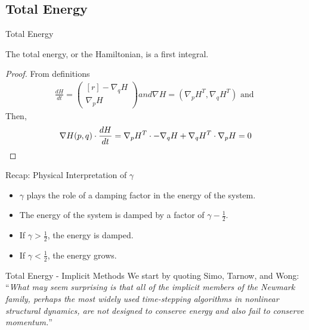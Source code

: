 \documentclass{beamer}
\begin{document}
\subsection{Total Energy}
\begin{frame}{Total Energy}
\begin{theorem} The total energy, or the Hamiltonian, is a first integral. \end{theorem}
\begin{proof}
From definitions
\begin{align*}
	\frac{dH}{dt} = \begin{pmatrix*}[r] -\nabla_{q}H \\ \nabla_{p}H \end{pmatrix*} and \nabla H = \left(\nabla_{p}H^{T}, \nabla_{q}H^{T}\right) \mbox{ and } 	
\end{align*}
Then, 
$$
\nabla H(p, q) \cdot \frac{dH}{dt} = \nabla_{p}H^{T}\cdot-\nabla_{q}H + \nabla_{q}H^{T}\cdot \nabla_{p}H = 0 \qedhere
$$
\end{proof} 
\end{frame}

\begin{frame}{Recap: Physical Interpretation of $\gamma$}
\begin{itemize}
	\item
	$\gamma$ plays the role of a damping factor in the energy of the system.
	\item
	The energy of the system is damped by a factor of $\gamma - \frac{1}{2}$.
	\item
	If $\gamma > \frac{1}{2}$, the energy is damped.
	\item
	If $\gamma < \frac{1}{2}$, the energy grows.
\end{itemize}
\end{frame}

\begin{frame}{Total Energy - Implicit Methods}
We start by quoting Simo, Tarnow, and Wong: \\
``\textit{What may seem surprising is that all of the implicit members of the Newmark family, perhaps the most widely used time-stepping algorithms in nonlinear structural dynamics, are not designed to conserve energy and also fail to conserve momentum.}''
\end{frame}
\end{document}
